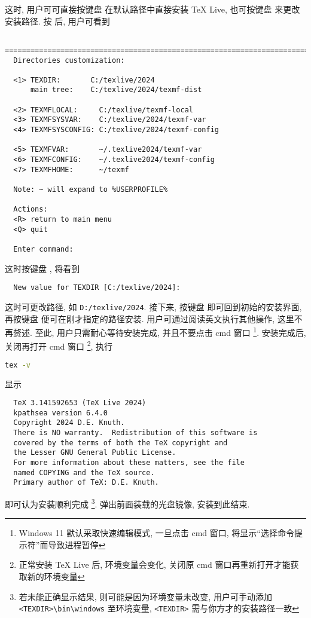这时, 用户可可直接按键盘  在默认路径中直接安装 \TeX{} Live,
也可按键盘  来更改安装路径.
按  后, 用户可看到
\begin{lstlisting}
  ==============================================================================
  Directories customization:
  
  <1> TEXDIR:       C:/texlive/2024
      main tree:    C:/texlive/2024/texmf-dist
  
  <2> TEXMFLOCAL:     C:/texlive/texmf-local
  <3> TEXMFSYSVAR:    C:/texlive/2024/texmf-var
  <4> TEXMFSYSCONFIG: C:/texlive/2024/texmf-config
  
  <5> TEXMFVAR:       ~/.texlive2024/texmf-var
  <6> TEXMFCONFIG:    ~/.texlive2024/texmf-config
  <7> TEXMFHOME:      ~/texmf
  
  Note: ~ will expand to %USERPROFILE%
  
  Actions:
  <R> return to main menu
  <Q> quit
  
  Enter command:
\end{lstlisting}
这时按键盘 , 将看到
\begin{lstlisting}
  New value for TEXDIR [C:/texlive/2024]:
\end{lstlisting}
这时可更改路径, 如 \texttt{D:/texlive/2024}.
接下来, 按键盘  即可回到初始的安装界面,
再按键盘  便可在刚才指定的路径安装.
用户可通过阅读英文执行其他操作, 这里不再赘述. 
至此, 用户只需耐心等待安装完成, 并且不要点击 \textsf{cmd} 窗口%
\footnote{Windows 11 默认采取快速编辑模式, 一旦点击 \textsf{cmd} 窗口,
将显示``选择命令提示符''而导致进程暂停}. 
安装完成后, 关闭再打开 \textsf{cmd} 窗口%
\footnote{正常安装 \TeX{} Live 后, 环境变量会变化,
关闭原 \textsf{cmd} 窗口再重新打开才能获取新的环境变量},
执行
\begin{lstlisting}[language = bash]
  tex -v
\end{lstlisting}
显示
\begin{lstlisting}
  TeX 3.141592653 (TeX Live 2024)
  kpathsea version 6.4.0
  Copyright 2024 D.E. Knuth.
  There is NO warranty.  Redistribution of this software is
  covered by the terms of both the TeX copyright and
  the Lesser GNU General Public License.
  For more information about these matters, see the file
  named COPYING and the TeX source.
  Primary author of TeX: D.E. Knuth.
\end{lstlisting}
即可认为安装顺利完成%
\footnote{若未能正确显示结果, 则可能是因为环境变量未改变,
用户可手动添加 \texttt{<TEXDIR>\textbackslash bin\textbackslash windows} 至环境变量,
\texttt{<TEXDIR>} 需与你方才的安装路径一致}.
弹出前面装载的光盘镜像,
安装到此结束.

